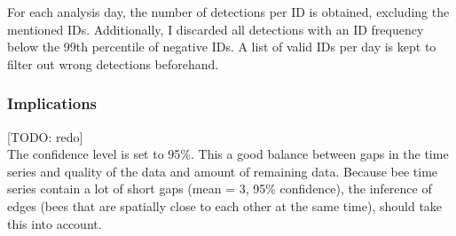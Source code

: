 For each analysis day, the number of detections per ID is obtained, excluding the mentioned IDs.
Additionally, I discarded all detections with an ID frequency below the 99th percentile of negative IDs.
A list of valid IDs per day is kept to filter out wrong detections beforehand.

\subsubsection{Implications}
[TODO: redo]\\
The confidence level is set to 95\%.
This a good balance between gaps in the time series and quality of the data and amount of remaining data.
Because bee time series contain a lot of short gaps (mean = 3, 95\% confidence), the inference of edges (bees that are spatially close to each other at the same time), should take this into account.